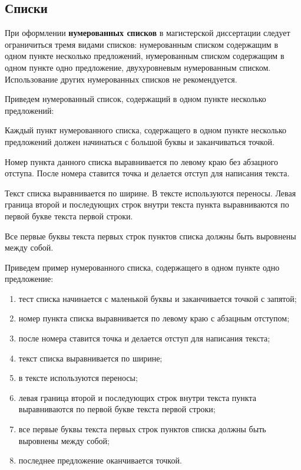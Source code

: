 \documentclass[12pt,a4paper, oneside]{extreport}
\begin{document}
\subsection{Списки}

При оформлении \textbf{нумерованных списков} в магистерской диссертации следует ограничиться тремя видами списков: нумерованным списком содержащим в одном пункте несколько предложений, нумерованным списком содержащим в одном пункте одно предложение, двухуровневым нумерованным списком. Использование других  нумерованных списков не рекомендуется.

Приведем нумерованный список, содержащий в одном пункте несколько предложений:
\begin{Enumerate}
\item 	Каждый пункт нумерованного списка, содержащего в одном пункте несколько предложений должен начинаться с большой буквы и заканчиваться точкой.
\item 	Номер пункта данного списка выравнивается по левому краю без абзацного отступа. После номера ставится точка и делается отступ для написания текста.
\item Текст списка выравнивается по ширине. В тексте используются переносы. Левая граница второй и последующих строк внутри текста пункта выравниваются по первой букве текста первой строки.
\item Все первые буквы текста первых строк пунктов списка должны быть выровнены между собой.
\end{Enumerate}

Приведем пример нумерованного списка, содержащего в одном пункте одно предложение:
	\begin{enumerate}
		\item тест списка начинается с маленькой буквы и заканчивается точкой с запятой;
		\item номер пункта списка выравнивается по левому краю с абзацным отступом;
		\item после номера ставится точка и делается отступ для написания текста;
		\item текст списка выравнивается по ширине;
		\item в тексте используются переносы;
		\item левая граница второй и последующих строк внутри текста пункта выравниваются по первой букве текста первой строки;
		\item все первые буквы текста первых строк пунктов списка должны быть выровнены между собой;
		\item последнее предложение оканчивается точкой.
	\end{enumerate}
\end{document}
